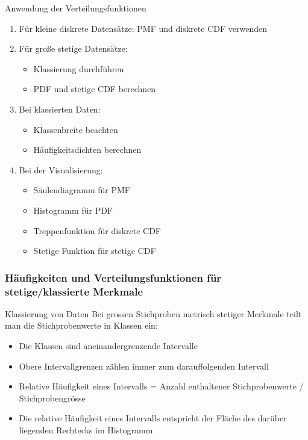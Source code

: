 \begin{KR}{Anwendung der Verteilungsfunktionen}
\begin{enumerate}
    \item Für kleine diskrete Datensätze: PMF und diskrete CDF verwenden
    \item Für große stetige Datensätze: 
    \begin{itemize}
        \item Klassierung durchführen
        \item PDF und stetige CDF berechnen
    \end{itemize}
    \item Bei klassierten Daten:
    \begin{itemize}
        \item Klassenbreite beachten
        \item Häufigkeitsdichten berechnen
    \end{itemize}
    \item Bei der Visualisierung:
    \begin{itemize}
        \item Säulendiagramm für PMF
        \item Histogramm für PDF
        \item Treppenfunktion für diskrete CDF
        \item Stetige Funktion für stetige CDF
    \end{itemize}
\end{enumerate}
\end{KR}

\subsubsection{Häufigkeiten und Verteilungsfunktionen für stetige/klassierte Merkmale}

\begin{definition}{Klassierung von Daten}
Bei grossen Stichproben metrisch stetiger Merkmale teilt man die Stichprobenwerte in Klassen ein:
\begin{itemize}
    \item Die Klassen sind aneinandergrenzende Intervalle
    \item Obere Intervallgrenzen zählen immer zum darauffolgenden Intervall
    \item Relative Häufigkeit eines Intervalls = Anzahl enthaltener Stichprobenwerte / Stichprobengrösse
    \item Die relative Häufigkeit eines Intervalls entspricht der Fläche des darüber liegenden Rechtecks im Histogramm
\end{itemize}
\end{definition}

